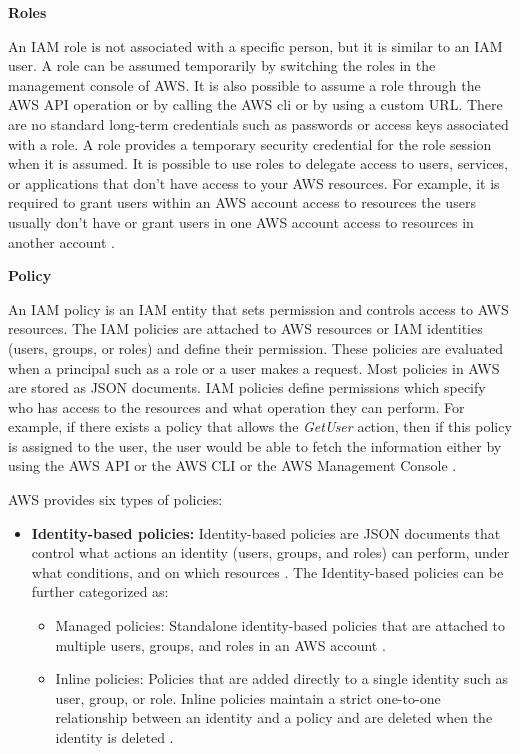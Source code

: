 \textbf{Roles}
\par An IAM role is not associated with a specific person,
but it is similar to an IAM user.
A role can be assumed
temporarily by switching the roles in the management
console of AWS. It is also possible to assume a role
through the AWS API operation or by calling the AWS
\gls{cli}
or by using a custom URL.
There are no standard long-term credentials such as passwords or access keys associated with a role.
A role provides a temporary security credential for the role session when it is assumed.
It is possible to use roles to delegate access to users, services, or applications that don't have access to your AWS resources. For example, it is required to grant users within an AWS account access to resources the users usually don’t have or grant users in one AWS account access to resources in another account \cite{27}.

\hfill \break
\textbf{Policy}

\par An IAM policy is an IAM entity that sets permission and controls access to AWS resources.
The IAM policies are attached to AWS resources or IAM identities (users, groups, or roles) and define their permission.
These policies are evaluated when a principal such as a role or a user makes a request.
Most policies in AWS are stored as JSON documents.
IAM policies define permissions which specify who has access to the resources and what operation they can perform.
For example, if there exists a policy that allows the
\textit{GetUser} action, then if this policy is assigned to the
user, the user would be able to fetch the information either by using the AWS API or the AWS CLI or the AWS Management Console \cite{14}.

\par AWS provides six types of policies:

\begin{itemize}
    \item \textbf{Identity-based policies:} Identity-based policies are JSON documents that control what actions an
    identity
    (users, groups, and roles) can perform, under what conditions, and on which resources \cite{27}.
    The Identity-based policies can be further categorized as:
    \begin{itemize}
        \item Managed policies: Standalone identity-based policies that are attached to multiple users, groups, and
        roles in an AWS account \cite{27}.
    \end{itemize}
    \begin{itemize}
        \item Inline policies:  Policies that are added directly to a single identity such as user, group, or role.
        Inline policies maintain a strict one-to-one relationship between an identity and a policy and are deleted when the identity is deleted \cite{27}.
    \end{itemize}
\end{itemize}

